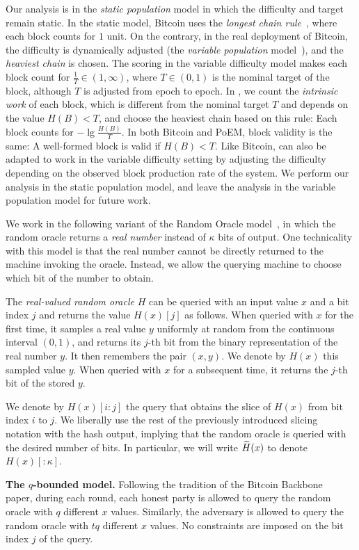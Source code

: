 \noindent
{}
Our analysis is in the \emph{static population} model in which the difficulty
and target remain static. In the static model, Bitcoin uses the \emph{longest chain rule}~\cite{backbone},
where each block counts for $1$ unit.
On the contrary, in the real deployment of Bitcoin, the difficulty is dynamically adjusted (the
\emph{variable population} model~\cite{varbackbone}), and the \emph{heaviest chain} is chosen.
The scoring in the variable difficulty model makes each block count for $\frac{1}{T} \in (1, \infty)$, where
$T \in (0, 1)$ is the nominal target of the block, although $T$ is adjusted from epoch to epoch.
In \poem, we count the \emph{intrinsic work}
of each block, which is different from the nominal target $T$ and depends on the value $H(B) < T$,
and choose the heaviest chain based on this rule: Each block counts for $-\lg\frac{H(B)}{T}$.
In both Bitcoin and PoEM, block validity is the same: A well-formed block is valid if $H(B) < T$.
Like Bitcoin, \poem can also be adapted to work in the variable difficulty setting by adjusting
the difficulty depending on the observed block production rate of the system.
We perform our analysis in the static population model, and leave the analysis in the variable
population model for future work.

We work in the following variant of the Random Oracle model~\cite{ro}, in which
the random oracle returns a \emph{real number} instead of $\kappa$ bits of output.
One technicality with this model is that the real number cannot be directly returned
to the machine invoking the oracle. Instead, we allow the querying machine to choose which
bit of the number to obtain.

\begin{definition}
  The \emph{real-valued random oracle} $H$ can be queried with an input value $x$
  and a bit index $j$ and returns the value $H(x)[j]$ as follows.
  When queried with $x$ for the first time,
  it samples a real value $y$ uniformly at random from the continuous interval $(0, 1)$,
  and returns its $j$-th bit from the binary representation of the real number $y$.
  It then remembers the pair $(x, y)$. We denote by $H(x)$ this sampled value $y$.
  When queried with $x$ for a subsequent time, it returns the $j$-th bit
  of the stored $y$.
\end{definition}

We denote by $H(x)[{i}{:}{j}]$ the query that obtains the slice of $H(x)$ from bit index $i$ to $j$.
We liberally use the rest of the previously introduced slicing notation with the hash output,
implying that the random oracle is queried with the desired number of bits.
In particular, we will write $\widetilde{H}(x)$ to denote $H(x)[{:}{\kappa}]$.

\noindent
\textbf{The $q$-bounded model.}
Following the tradition of the Bitcoin Backbone~\cite{backbone} paper,
during each round, each honest party is allowed to query the random oracle with $q$
different $x$ values. Similarly, the adversary is allowed to query the random oracle
with $t q$ different $x$ values. No constraints are imposed on the bit index $j$
of the query.